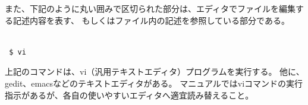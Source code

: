 また、下記のように丸い囲みで区切られた部分は、エディタでファイルを編集する記述内容を表す、
もしくはファイル内の記述を参照している部分である。\\
{\small {\gt
{}}}\\


\begin{verbatim}
 $ vi
\end{verbatim}

上記のコマンドは、vi（汎用テキストエディタ）プログラムを実行する。
他に、gedit、emacsなどのテキストエディタがある。
マニュアルではviコマンドの実行指示があるが、各自の使いやすいエディタへ適宜読み替えること。
